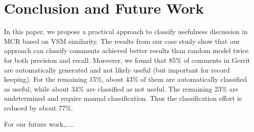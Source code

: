 
\section{Conclusion and Future Work}
In this paper, we propose a practical approach to classify usefulness discussion in MCR based on VSM similarity.
The results from our case study show that our approach can classify comments achieved better results than random model twice for both precision and recall.
Moreover, we found that 85\% of comments in Gerrit are automatically generated and not likely useful (but important for record keeping). For the remaining 15\%, about 43\% of them are automatically classified as useful, while about 34\% are classified as not useful. The remaining 23\% are undetermined and require manual classification. Thus the classification effort is reduced by about 77\%.

For our future work,.....